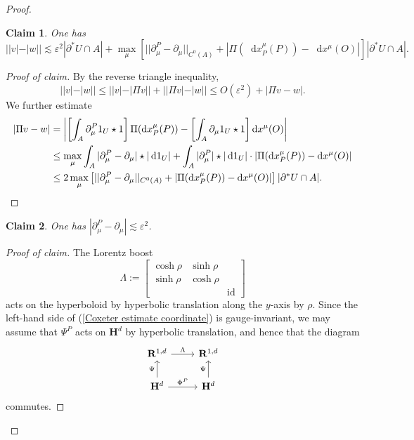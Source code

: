 \documentclass[reqno,10pt]{amsart}
\newcommand{\RR}{\mathbf{R}}
\newcommand{\Hyp}{\mathbf H}
\DeclareMathOperator{\id}{id}
\newcommand*\dif{\mathop{}\!\mathrm{d}}
\newtheorem{claim}{Claim}[theorem]
\theoremstyle{definition}
\numberwithin{equation}{section}
\begin{document}
\begin{proof}
\begin{claim}
One has
$$||v| - |w|| \lesssim \varepsilon^2 |\partial^* U \cap A| + \max_\mu \left[||\partial^P_\mu - \partial_\mu||_{C^0(A)} + |\Pi(\dif x_P^\mu(P)) - \dif x^\mu(O)|\right] |\partial^* U \cap A|.$$
\end{claim}
\begin{proof}[Proof of claim]
By the reverse triangle inequality,
$$||v| - |w|| \leq ||v| - |\Pi v|| + ||\Pi v| - |w|| \leq O(\varepsilon^2) + |\Pi v - w|.$$
We further estimate
\begin{align*}
|\Pi v - w| &= \left|\left[\int_A \partial^P_\mu 1_U \star 1\right] \Pi(\dif x_P^\mu(P)) - \left[\int_A \partial_\mu 1_U \star 1\right] \dif x^\mu(O)\right| \\
&\leq \max_\mu \int_A |\partial^P_\mu - \partial_\mu| \star |\dif 1_U| + \int_A |\partial_\mu^P| \star |\dif 1_U| \cdot |\Pi(\dif x_P^\mu(P)) - \dif x^\mu(O)| \\
&\leq 2 \max_\mu \left[||\partial^P_\mu - \partial_\mu||_{C^0(A)} + |\Pi(\dif x_P^\mu(P)) - \dif x^\mu(O)|\right] |\partial^* U \cap A|. \qedhere
\end{align*}
\end{proof}

\begin{claim}
One has $|\partial^P_\mu - \partial_\mu| \lesssim \varepsilon^2$.
\end{claim}
\begin{proof}[Proof of claim]
The Lorentz boost
$$\Lambda := \begin{bmatrix}\cosh \rho & \sinh \rho \\ \sinh \rho & \cosh \rho \\ &&\id\end{bmatrix}$$
acts on the hyperboloid by hyperbolic translation along the $y$-axis by $\rho$.
Since the left-hand side of (\ref{Coxeter estimate coordinate}) is gauge-invariant, we may assume that $\Psi^P$ acts on $\Hyp^d$ by hyperbolic translation, and hence that the diagram
\begin{equation}\label{compatible isometry diagram}
\begin{tikzcd}
\RR^{1, d} \arrow[r, "\Lambda"] & \RR^{1, d} \\
\Hyp^d \arrow[u, "\Psi"] \arrow[r, "\Phi^P"] & \Hyp^d \arrow[u, "\Psi"]
\end{tikzcd}
\end{equation}
commutes. 


\end{proof}
\end{proof}
\end{document}
